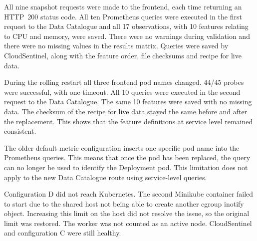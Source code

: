 
All nine snapshot requests were made to the frontend, each time returning an HTTP~200 status code. All ten Prometheus queries were executed in the first request to the Data Catalogue and all 17 observations, with 10 features relating to CPU and memory, were saved. There were no warnings during validation and there were no missing values in the results matrix. Queries were saved by CloudSentinel, along with the feature order, file checksums and recipe for live data.

During the rolling restart all three frontend pod names changed. 44/45 probes were successful, with one timeout. All 10 queries were executed in the second request to the Data Catalogue. The same 10 features were saved with no missing data. The checksum of the recipe for live data stayed the same before and after the replacement. This shows that the feature definitions at service level remained consistent.

The older default metric configuration inserts one specific pod name into the Prometheus queries. This means that once the pod has been replaced, the query can no longer be used to identify the Deployment pod. This limitation does not apply to the new Data Catalogue route using service-level queries.

Configuration D did not reach Kubernetes. The second Minikube container failed to start due to the shared host not being able to create another cgroup inotify object. Increasing this limit on the host did not resolve the issue, so the original limit was restored. The worker was not counted as an active node. CloudSentinel and configuration C were still healthy.

